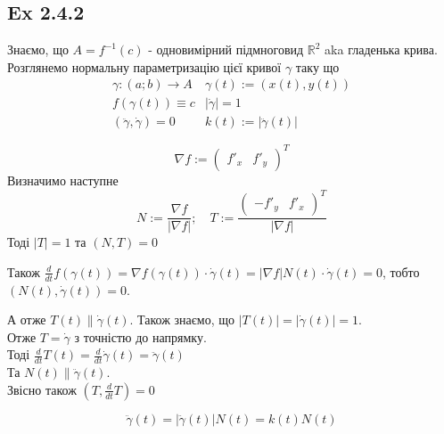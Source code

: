 \documentclass[10pt, a4paper]{article} %
\newcommand{\R}{\mathbb{R}}
\begin{document}

\subsection*{Ex 2.4.2}

Знаємо, що $A = f^{-1}(c)$ - одновимірний підмноговид $\R^2$ aka гладенька крива.
Розглянемо нормальну параметризацію цієї кривої $\gamma$ таку що
\[\begin{array}{ll}
    \gamma : (a;b) \to A
    & \gamma(t) := (x(t), y(t))\\
    f(\gamma(t)) \equiv c
    & |\dot\gamma| = 1\\
    (\ddot\gamma, \dot\gamma) = 0
    & k(t) := |\ddot\gamma(t)|
\end{array}\]

\[\nabla f := \begin{pmatrix}
    f'_x & f'_y
\end{pmatrix}^T\]
Визначимо наступне 
\[N := \frac{\nabla f}{|\nabla f|}; \quad T := \frac{\begin{pmatrix}-f'_y & f'_x\end{pmatrix}^T}{|\nabla f|}\]
Тоді
$|T|=1$ та $(N,T)=0$

Також $\frac{d}{dt}f(\gamma(t)) = \nabla f(\gamma(t)) \cdot \dot \gamma(t) = |\nabla f|N(t) \cdot \dot\gamma(t) = 0$,  тобто $(N(t), \dot\gamma(t)) = 0$.

А отже $T(t) \parallel \dot\gamma(t)$. Також знаємо, що $|T(t)|=|\dot\gamma(t)|=1$.\\
Отже $T=\dot\gamma$ з точністю до напрямку. \\
Тоді $\frac{d}{dt}T(t)=\frac{d}{dt}\dot\gamma(t)=\ddot\gamma(t)$\\
Та $N(t) \parallel \ddot \gamma(t)$.\\
Звісно також $(T, \frac{d}{dt}T) = 0$

\[\ddot\gamma(t) = |\ddot\gamma(t)| N(t) = k(t)N(t)\]
\end{document}
